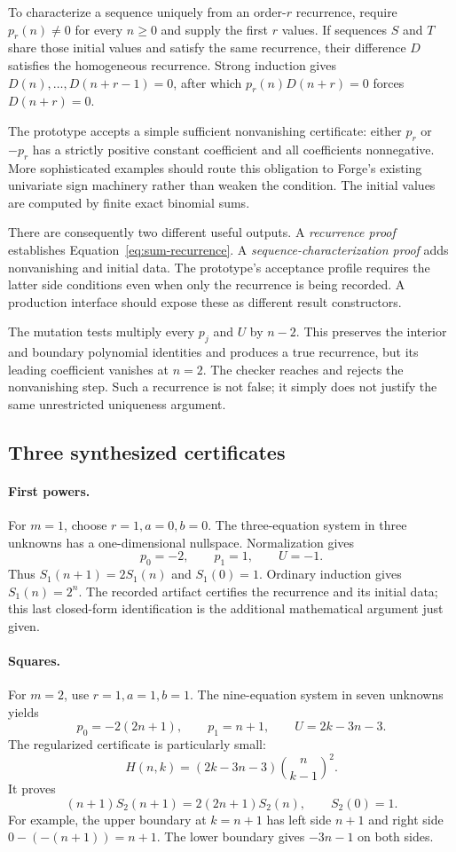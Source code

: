 To characterize a sequence uniquely from an order-$r$ recurrence, require
$p_r(n)\ne0$ for every $n\ge0$ and supply the first $r$ values. If sequences $S$
and $T$ share those initial values and satisfy the same recurrence, their
difference $D$ satisfies the homogeneous recurrence. Strong induction gives
$D(n),\ldots,D(n+r-1)=0$, after which $p_r(n)D(n+r)=0$ forces $D(n+r)=0$.

The prototype accepts a simple sufficient nonvanishing certificate: either
$p_r$ or $-p_r$ has a strictly positive constant coefficient and all coefficients
nonnegative. More sophisticated examples should route this obligation to
Forge's existing univariate sign machinery rather than weaken the condition.
The initial values are computed by finite exact binomial sums.

There are consequently two different useful outputs. A \emph{recurrence proof}
establishes Equation~\eqref{eq:sum-recurrence}. A \emph{sequence-characterization
proof} adds nonvanishing and initial data. The prototype's acceptance profile
requires the latter side conditions even when only the recurrence is being
recorded. A production interface should expose these as different result
constructors.

The mutation tests multiply every $p_j$ and $U$ by $n-2$. This preserves the
interior and boundary polynomial identities and produces a true recurrence,
but its leading coefficient vanishes at $n=2$. The checker reaches and rejects
the nonvanishing step. Such a recurrence is not false; it simply does not
justify the same unrestricted uniqueness argument.

\subsection{Three synthesized certificates}

\paragraph{First powers.}
For $m=1$, choose $r=1,a=0,b=0$. The three-equation system in three unknowns has
a one-dimensional nullspace. Normalization gives
\[
 p_0=-2,\qquad p_1=1,\qquad U=-1.
\]
Thus $S_1(n+1)=2S_1(n)$ and $S_1(0)=1$. Ordinary induction gives $S_1(n)=2^n$.
The recorded artifact certifies the recurrence and its initial data; this last
closed-form identification is the additional mathematical argument just given.

\paragraph{Squares.}
For $m=2$, use $r=1,a=1,b=1$. The nine-equation system in seven unknowns yields
\[
 p_0=-2(2n+1),\qquad p_1=n+1,\qquad U=2k-3n-3.
\]
The regularized certificate is particularly small:
\[
 H(n,k)=(2k-3n-3)\binom{n}{k-1}^2.
\]
It proves
\begin{equation}
 (n+1)S_2(n+1)=2(2n+1)S_2(n),\qquad S_2(0)=1.
 \label{eq:square-recurrence}
\end{equation}
For example, the upper boundary at $k=n+1$ has left side $n+1$ and right side
$0-(-(n+1))=n+1$. The lower boundary gives $-3n-1$ on both sides.

